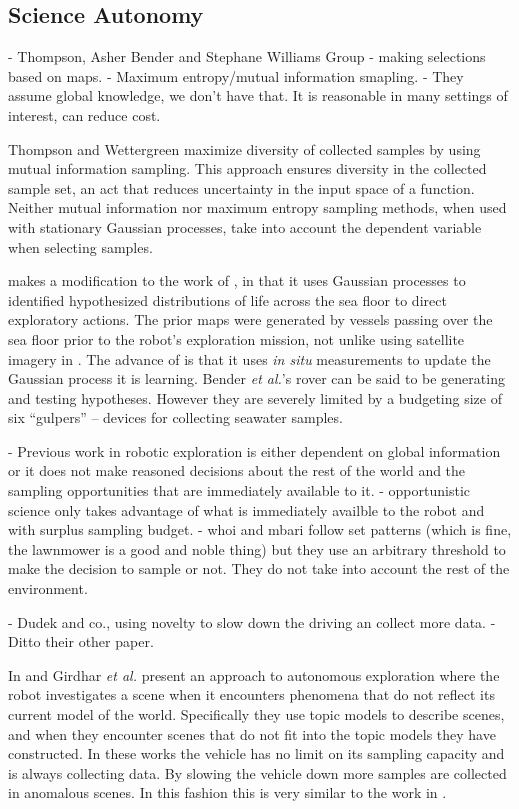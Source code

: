 \subsection{Science Autonomy}

	- Thompson, Asher Bender and Stephane Williams Group
			- making selections based on maps.  
			- Maximum entropy/mutual information smapling.
			- They assume global knowledge, we don't have that.  It is reasonable
			in many settings of interest, can reduce cost.

Thompson and Wettergreen \cite{thompson2008intelligent} maximize diversity of
collected samples by using mutual information sampling.  This approach ensures
diversity in the collected sample set, an act that reduces uncertainty in the
input space of a function.  Neither mutual information nor maximum entropy
sampling methods, when used with stationary Gaussian processes, take into
account the dependent variable when selecting samples.  


\cite{bender2013autonomous} makes a modification to the work of
\cite{thompson2008intelligent}, in that it uses Gaussian processes to
identified hypothesized distributions of life across the sea floor to direct
exploratory actions.  The prior maps were generated by vessels passing over the
sea floor prior to the robot's exploration mission, not unlike using satellite
imagery in \cite{thompson2008intelligent}.  The advance of
\cite{bender2013autonomous} is that it uses \emph{in situ} measurements to
update the Gaussian process it is learning.  Bender \emph{et al.}'s rover can
be said to be generating and testing hypotheses.  However they are severely
limited by a budgeting size of six ``gulpers'' -- devices for collecting
seawater samples.


	- Previous work in robotic exploration is either dependent on global information or it does not make reasoned decisions about the rest of the world and the sampling opportunities that are immediately available to it.
			- opportunistic science only takes advantage of what is immediately availble to the robot and with surplus sampling budget.
			- whoi and mbari follow set patterns (which is fine, the lawnmower is a good and noble thing) but they use an arbitrary threshold to make the decision to sample or not.  They do not take into account the rest of the environment.


	- Dudek and co., using novelty to slow down the driving an collect more data.
		- Ditto their other paper.

In \cite{gridhar2013autonomous} and \cite{girdhar2013Aautonomous} Girdhar
\emph{et al.} present an approach to autonomous exploration where the robot
investigates a scene when it encounters phenomena that do not reflect its
current model of the world.  Specifically they use topic models to describe
scenes, and when they encounter scenes that do not fit into the topic models
they have constructed.  In these works the vehicle has no limit on its sampling
capacity and is always collecting data.  By slowing the vehicle down more
samples are collected in anomalous scenes.  In this fashion this is very
similar to the work in \cite{thompson2013adaptive}.

